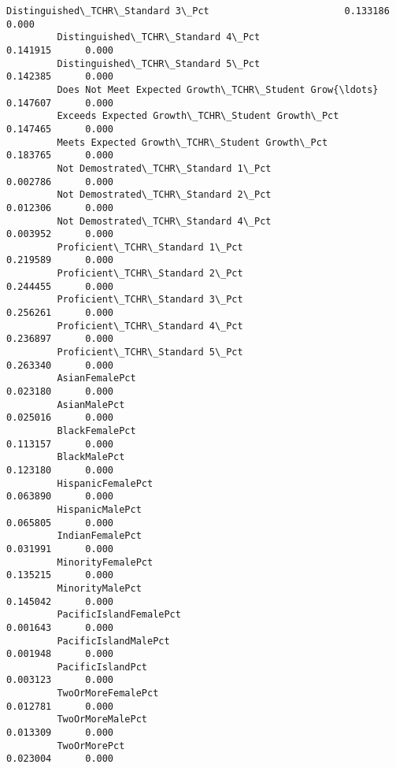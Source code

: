 \documentclass[11pt]{article}
\begin{document}
\begin{Verbatim}[commandchars=\\\{\}]
         Distinguished\_TCHR\_Standard 3\_Pct                        0.133186      0.000   
         Distinguished\_TCHR\_Standard 4\_Pct                        0.141915      0.000   
         Distinguished\_TCHR\_Standard 5\_Pct                        0.142385      0.000   
         Does Not Meet Expected Growth\_TCHR\_Student Grow{\ldots}       0.147607      0.000   
         Exceeds Expected Growth\_TCHR\_Student Growth\_Pct          0.147465      0.000   
         Meets Expected Growth\_TCHR\_Student Growth\_Pct            0.183765      0.000   
         Not Demostrated\_TCHR\_Standard 1\_Pct                      0.002786      0.000   
         Not Demostrated\_TCHR\_Standard 2\_Pct                      0.012306      0.000   
         Not Demostrated\_TCHR\_Standard 4\_Pct                      0.003952      0.000   
         Proficient\_TCHR\_Standard 1\_Pct                           0.219589      0.000   
         Proficient\_TCHR\_Standard 2\_Pct                           0.244455      0.000   
         Proficient\_TCHR\_Standard 3\_Pct                           0.256261      0.000   
         Proficient\_TCHR\_Standard 4\_Pct                           0.236897      0.000   
         Proficient\_TCHR\_Standard 5\_Pct                           0.263340      0.000   
         AsianFemalePct                                           0.023180      0.000   
         AsianMalePct                                             0.025016      0.000   
         BlackFemalePct                                           0.113157      0.000   
         BlackMalePct                                             0.123180      0.000   
         HispanicFemalePct                                        0.063890      0.000   
         HispanicMalePct                                          0.065805      0.000   
         IndianFemalePct                                          0.031991      0.000   
         MinorityFemalePct                                        0.135215      0.000   
         MinorityMalePct                                          0.145042      0.000   
         PacificIslandFemalePct                                   0.001643      0.000   
         PacificIslandMalePct                                     0.001948      0.000   
         PacificIslandPct                                         0.003123      0.000   
         TwoOrMoreFemalePct                                       0.012781      0.000   
         TwoOrMoreMalePct                                         0.013309      0.000   
         TwoOrMorePct                                             0.023004      0.000   

\end{Verbatim}
\end{document}
